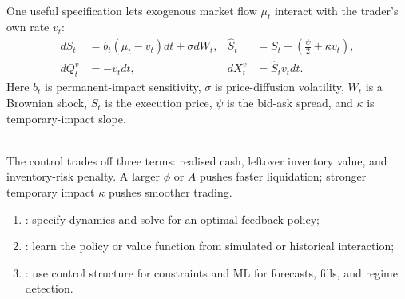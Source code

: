 \documentclass[a4paper,oneside,openany]{book}
\begin{document}
\begin{model} \\
One useful specification lets exogenous market flow $\mu_t$ interact with the trader's own rate $v_t$:
\begin{align*}
dS_t&=b_t(\mu_t-v_t)dt+\sigma dW_t, & \widehat{S}_t&=S_t-\left(\frac{\psi}{2}+\kappa v_t\right),\\
dQ_t^v&=-v_tdt, & dX_t^v&=\widehat{S}_t v_tdt.
\end{align*}
Here $b_t$ is permanent-impact sensitivity, $\sigma$ is price-diffusion volatility, $W_t$ is a Brownian shock, $\widehat{S}_t$ is the execution price, $\psi$ is the bid-ask spread, and $\kappa$ is temporary-impact slope.
\end{model}

\begin{principle} \\
The control trades off three terms: realised cash, leftover inventory value, and inventory-risk penalty. A larger $\phi$ or $A$ pushes faster liquidation; stronger temporary impact $\kappa$ pushes smoother trading.
\end{principle}

\begin{taxonomy} 
\begin{enumerate}[label=\roman*.]
\setlength{\itemsep}{0pt}
\item {}: specify dynamics and solve for an optimal feedback policy;
\item {}: learn the policy or value function from simulated or historical interaction;
\item {}: use control structure for constraints and ML for forecasts, fills, and regime detection.
\end{enumerate}
\end{taxonomy}
\end{document}
